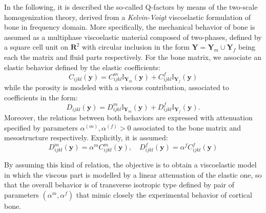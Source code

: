 In the following, it is described the so-called Q-factors by means of the two-scale homogenization theory, derived from a \textit{Kelvin-Voigt} viscoelastic formulation of bone in frequency domain. More specifically, the mechanical behavior of bone is assumed as a multiphase viscoelastic material composed of two-phases, defined by a square cell unit on $\mathbf{R}^2$ with circular inclusion in the form $\mathbf{Y} = \mathbf{Y}_{m} \cup \mathbf{Y}_{f}$ being each the matrix and fluid parts respectively.
For the bone matrix, we associate an elastic behavior defined by the elastic coefficients:
\begin{equation*}
    C_{ijkl}(\mathbf{y}) = C_{ijkl}^m \mathbb{I}_{\mathbf{Y}_m}(\mathbf{y}) + C_{ijkl}^f \mathbb{I}_{\mathbf{Y}_f}(\mathbf{y})
\end{equation*}
while the porosity is modeled with a viscous contribution, associated to coefficients in the form:
\begin{equation*}
    D_{ijkl}(\mathbf{y}) =  D_{ijkl}^m \mathbb{I}_{\mathbf{Y}_m}(\mathbf{y}) + D_{ijkl}^f \mathbb{I}_{\mathbf{Y}_f}(\mathbf{y}).
\end{equation*}
Moreover, the relations between both behaviors are expressed with attenuation specified by parameters $\alpha^{(m)}, \alpha^{(f)} >0$ associated to the bone matrix and mesostructure respectively. Explicitly, it is assumed:
\begin{equation*}
    D_{ijkl}^m(\mathbf{y}) = \alpha^{m} C_{ijkl}^m(\mathbf{y}) , \quad D_{ijkl}^f (\mathbf{y}) = \alpha^{f} C_{ijkl}^f(\mathbf{y})
\end{equation*}


\begin{rem}
By assuming this kind of relation, the objective is to obtain a viscoelastic model in which the viscous part is modelled by a linear attenuation of the elastic one, so that the overall behavior is of transverse isotropic type defined by pair of parameters $(\alpha^m, \alpha^f)$ that mimic closely the experimental behavior of cortical bone.
\end{rem}


